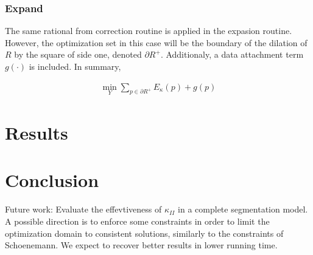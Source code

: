 \documentclass[runningheads]{llncs}
\begin{document}
\subsubsection{Expand}
The same rational from correction routine is applied in the expasion routine. However, the optimization set in this case will be the boundary of the dilation of $R$ by the square of side one, denoted $\partial R^+$. Additionaly, a data attachment term $g(\cdot)$ is included. In summary,

	\begin{align}
		\min_{Y} \sum_{p \in \partial R^+}E_{\kappa}(p) + g(p)
		\label{eq:optimization_problem_no_conn}
	\end{align}
	
	

\section{Results}

\section{Conclusion}

Future work: Evaluate the effevtiveness of $\kappa_{II}$ in a complete segmentation model. A possible direction is to enforce some constraints in order to limit the optimization domain to consistent solutions, similarly to the constraints of Schoenemann. We expect to recover better results in lower running time.


%
%
%


\end{document}
